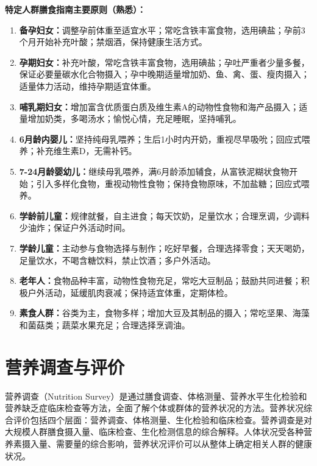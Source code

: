 \begin{keybox}
\textbf{特定人群膳食指南主要原则（熟悉）：}

\begin{enumerate}[leftmargin=*]
    \item \textbf{备孕妇女：}调整孕前体重至适宜水平；常吃含铁丰富食物，选用碘盐；孕前3个月开始补充叶酸；禁烟酒，保持健康生活方式。
    \item \textbf{孕期妇女：}补充叶酸，常吃含铁丰富食物，选用碘盐；孕吐严重者少量多餐，保证必要量碳水化合物摄入；孕中晚期适量增加奶、鱼、禽、蛋、瘦肉摄入；适量体力活动，维持孕期适宜体重。
    \item \textbf{哺乳期妇女：}增加富含优质蛋白质及维生素A的动物性食物和海产品摄入；适量增加奶类，多喝汤水；愉悦心情，充足睡眠，坚持哺乳。
    \item \textbf{6月龄内婴儿：}坚持纯母乳喂养；生后1小时内开奶，重视尽早吸吮；回应式喂养；补充维生素D，无需补钙。
    \item \textbf{7-24月龄婴幼儿：}继续母乳喂养，满6月龄添加辅食，从富铁泥糊状食物开始；引入多样化食物，重视动物性食物；保持食物原味，不加盐糖；回应式喂养。
    \item \textbf{学龄前儿童：}规律就餐，自主进食；每天饮奶，足量饮水；合理烹调，少调料少油炸；保证户外活动时间。
    \item \textbf{学龄儿童：}主动参与食物选择与制作；吃好早餐，合理选择零食；天天喝奶，足量饮水，不喝含糖饮料，禁止饮酒；多户外活动。
    \item \textbf{老年人：}食物品种丰富，动物性食物充足，常吃大豆制品；鼓励共同进餐；积极户外活动，延缓肌肉衰减；保持适宜体重，定期体检。
    \item \textbf{素食人群：}谷类为主，食物多样；增加大豆及其制品的摄入；常吃坚果、海藻和菌菇类；蔬菜水果充足；合理选择烹调油。
\end{enumerate}
\end{keybox}

\section{营养调查与评价}

营养调查（Nutrition Survey）是通过膳食调查、体格测量、营养水平生化检验和营养缺乏症临床检查等方法，全面了解个体或群体的营养状况的方法。营养状况综合评价包括四个层面：营养调查、体格测量、生化检验和临床检查。营养调查是对大规模人群膳食摄入量、临床检查、生化检测信息的综合解释。人体状况受各种营养素摄入量、需要量的综合影响，营养状况评价可以从整体上确定相关人群的健康状况。

